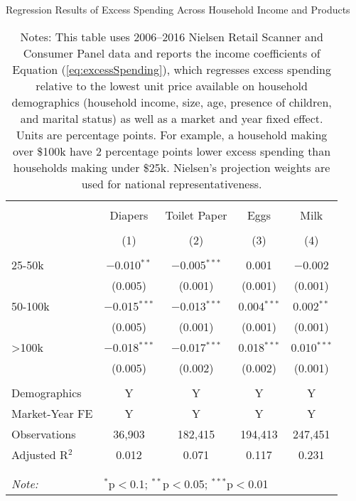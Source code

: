 
\begin{table}[!htbp] \centering
  \caption{Regression Results of Excess Spending Across Household Income and Products}
  \label{tab:lowestPrice}
\begin{tabular}{@{\extracolsep{5pt}}lcccc}
\\[-1.8ex]\hline
\hline \\[-1.8ex]
 & Diapers & Toilet Paper & Eggs & Milk \\
\\[-1.8ex] & (1) & (2) & (3) & (4)\\
\hline \\[-1.8ex]
 25-50k & $-$0.010$^{**}$ & $-$0.005$^{***}$ & 0.001 & $-$0.002 \\
  & (0.005) & (0.001) & (0.001) & (0.001) \\
  50-100k & $-$0.015$^{***}$ & $-$0.013$^{***}$ & 0.004$^{***}$ & 0.002$^{**}$ \\
  & (0.005) & (0.001) & (0.001) & (0.001) \\
  >100k & $-$0.018$^{***}$ & $-$0.017$^{***}$ & 0.018$^{***}$ & 0.010$^{***}$ \\
  & (0.005) & (0.002) & (0.002) & (0.001) \\
 \hline \\[-1.8ex]
Demographics & Y & Y & Y & Y \\
Market-Year FE & Y & Y & Y & Y \\
Observations & 36,903 & 182,415 & 194,413 & 247,451 \\
Adjusted R$^{2}$ & 0.012 & 0.071 & 0.117 & 0.231 \\
\\[-1.8ex]\hline
\hline \\[-1.8ex]
\textit{Note:}  & \multicolumn{4}{l}{$^{*}$p$<$0.1; $^{**}$p$<$0.05; $^{***}$p$<$0.01} \\
\end{tabular}
\caption*{Notes: This table uses 2006--2016 Nielsen Retail Scanner and Consumer Panel data and reports the income coefficients of Equation (\ref{eq:excessSpending}), which regresses excess spending relative to the lowest unit price available on household demographics (household income, size, age, presence of children, and marital status) as well as a market and year fixed effect. Units are percentage points. For example, a household making over \$100k have 2 percentage points lower excess spending than households making under \$25k. Nielsen's projection weights are used for national representativeness.}
\end{table}
